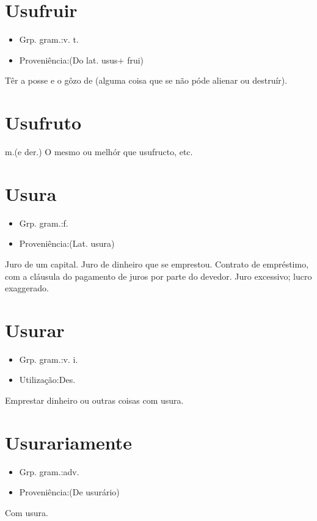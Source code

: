 \documentclass{article}
\begin{document}
\section{Usufruir}
\begin{itemize}
\item {Grp. gram.:v. t.}
\end{itemize}
\begin{itemize}
\item {Proveniência:(Do lat. \textunderscore usus\textunderscore  + \textunderscore frui\textunderscore )}
\end{itemize}
Têr a posse e o gôzo de (alguma coisa que se não póde alienar ou destruír).
\section{Usufruto}
\textunderscore m.\textunderscore  (e der.)
O mesmo ou melhór que \textunderscore usufructo\textunderscore , etc.
\section{Usura}
\begin{itemize}
\item {Grp. gram.:f.}
\end{itemize}
\begin{itemize}
\item {Proveniência:(Lat. \textunderscore usura\textunderscore )}
\end{itemize}
Juro de um capital.
Juro de dinheiro que se emprestou.
Contrato de empréstimo, com a cláusula do pagamento de juros por parte do devedor.
Juro excessivo; lucro exaggerado.
\section{Usurar}
\begin{itemize}
\item {Grp. gram.:v. i.}
\end{itemize}
\begin{itemize}
\item {Utilização:Des.}
\end{itemize}
Emprestar dinheiro ou outras coisas com usura.
\section{Usurariamente}
\begin{itemize}
\item {Grp. gram.:adv.}
\end{itemize}
\begin{itemize}
\item {Proveniência:(De \textunderscore usurário\textunderscore )}
\end{itemize}
Com usura.
\end{document}
